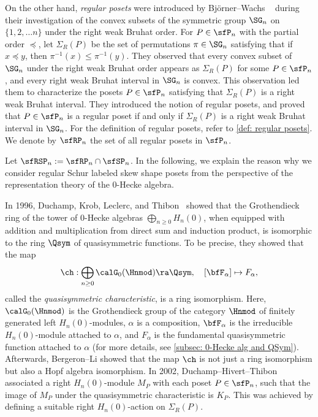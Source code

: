 \documentclass[12pt, reqno]{amsart}
\theoremstyle{definition}
\numberwithin{equation}{section} \numberwithin{figure}{section}
\numberwithin{table}{section}
\begin{document}
On the other hand, \emph{regular posets} were introduced by Bj\"{o}rner--Wachs ~\cite{91BW} during their investigation of the convex subsets of the symmetric group $\SG_n$ on $\{1,2, \ldots n\}$ under the right weak Bruhat order.
For $P \in \sfP_n$ with the partial order $\preceq$, let $\Sigma_R(P)$ be the set  of permutations $\pi \in \SG_n$ satisfying that if $x \preceq y$, then $\pi^{-1}(x) \le \pi^{-1}(y)$.
They 
observed  that every convex subset  of $\SG_n$ under the right weak Bruhat order appears as $\Sigma_R(P)$ for some $P \in \sfP_n$, and 
every right weak Bruhat interval in $\SG_n$ is convex.
This observation led them to characterize the posets $P \in \sfP_n$ satisfying that $\Sigma_R(P)$ is a right weak Bruhat interval. 
They introduced the notion of regular posets, and  proved that $P \in \sfP_n$ is a regular poset if and only if $\Sigma_R(P)$ is a right weak Bruhat interval in $\SG_n$.
For the definition of regular posets, refer to \cref{def: regular posets}.
We denote by $\sfRP_n$ the set of all regular posets in $\sfP_n$.


Let $\sfRSP_n := \sfRP_n \cap \sfSP_n$.
In the following, we explain the reason why we consider regular Schur labeled skew shape posets from the perspective of the representation theory of the $0$-Hecke algebra.


In 1996, Duchamp, Krob, Leclerc, and Thibon~\cite{96DKLT} showed that the Grothendieck ring of the tower of $0$-Hecke algebras $\bigoplus_{n\ge 0}H_n(0)$, when equipped with addition and multiplication from direct sum and induction product, is isomorphic to the ring $\Qsym$ of quasisymmetric functions.
To be precise, they showed that 
the map  
\begin{align*}
\ch : \bigoplus_{n \ge 0} \calG_0(\Hnmod) \ra \Qsym, \quad [\bfF_\alpha] \mapsto F_{\alpha},
\end{align*}
called the \emph{quasisymmetric characteristic},
is a ring isomorphism.
Here, $\calG_0(\Hnmod)$ is the Grothendieck group of the category $\Hnmod$ of finitely generated left $H_n(0)$-modules, $\alpha$ is a composition, $\bfF_\alpha$ is the irreducible $H_n(0)$-module attached to $\alpha$, and $F_\alpha$ is the fundamental quasisymmetric function attached to $\alpha$ (for more details, see \cref{subsec: 0-Hecke alg and QSym}).
Afterwards, Bergeron--Li \cite{09BL} showed that the map $\ch$ is not just a ring isomorphism but also a Hopf algebra isomorphism.
In 2002, Duchamp--Hivert--Thibon \cite{02DHT} associated a right $H_n(0)$-module $M_P$ with each poset $P \in \sfP_n$, such that the image of $M_P$ under the quasisymmetric characteristic is $K_P$. 
This was achieved by defining a suitable right $H_n(0)$-action on  $\Sigma_R(P)$.
\end{document}
